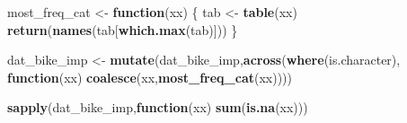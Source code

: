 \documentclass[
]{book}
\newenvironment{Shaded}{\begin{snugshade}}{\end{snugshade}}
\newcommand{\ControlFlowTok}[1]{\textcolor[rgb]{0.13,0.29,0.53}{\textbf{#1}}}
\newcommand{\KeywordTok}[1]{\textcolor[rgb]{0.13,0.29,0.53}{\textbf{#1}}}
\newcommand{\NormalTok}[1]{#1}
\newcommand{\StringTok}[1]{\textcolor[rgb]{0.31,0.60,0.02}{#1}}
\begin{document}
\begin{Shaded}
\begin{Highlighting}[]
\NormalTok{most_freq_cat <-}\StringTok{ }\ControlFlowTok{function}\NormalTok{(xx)}
\NormalTok{\{}
\NormalTok{  tab <-}\StringTok{ }\KeywordTok{table}\NormalTok{(xx)}
  \KeywordTok{return}\NormalTok{(}\KeywordTok{names}\NormalTok{(tab[}\KeywordTok{which.max}\NormalTok{(tab)]))}
\NormalTok{\}}

\NormalTok{dat_bike_imp <-}\StringTok{ }\KeywordTok{mutate}\NormalTok{(dat_bike_imp,}\KeywordTok{across}\NormalTok{(}\KeywordTok{where}\NormalTok{(is.character),}
                                           \ControlFlowTok{function}\NormalTok{(xx) }\KeywordTok{coalesce}\NormalTok{(xx,}\KeywordTok{most_freq_cat}\NormalTok{(xx))))}

\KeywordTok{sapply}\NormalTok{(dat_bike_imp,}\ControlFlowTok{function}\NormalTok{(xx) }\KeywordTok{sum}\NormalTok{(}\KeywordTok{is.na}\NormalTok{(xx)))}
\end{Highlighting}
\end{Shaded}
\end{document}
